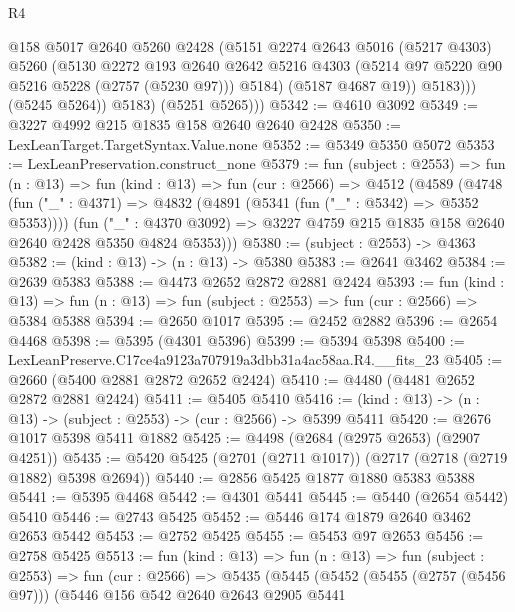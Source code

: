 \begin{lexlean}{R4}
\begin{coremodule}
                  @158
                  @5017
                  @2640
                  @5260
                  @2428
                  (@5151
                    @2274
                    @2643
                    @5016
                    (@5217 @4303)
                    @5260
                    (@5130
                      @2272
                      @193
                      @2640
                      @2642
                      @5216
                      @4303
                      (@5214 @97 @5220 @90 @5216 @5228 (@2757 (@5230 @97)))
                      @5184)
                    (@5187 @4687 @19))
                  @5183)))
            (@5245 @5264))
          @5183)
        (@5251 @5265)))
@5342 := @4610 @3092
@5349 := @3227 @4992 @215 @1835 @158 @2640 @2640 @2428
@5350 := LexLeanTarget.TargetSyntax.Value.none
@5352 := @5349 @5350 @5072
@5353 := LexLeanPreservation.construct_none
@5379 := fun (subject : @2553) =>
  fun (n : @13) =>
  fun (kind : @13) =>
  fun (cur : @2566) =>
  @4512
    (@4589
      (@4748
        (fun ("_" : @4371) => @4832 (@4891 (@5341 (fun ("_" : @5342) => @5352 @5353))))
        (fun ("_" : @4370 @3092) =>
        @3227 @4759 @215 @1835 @158 @2640 @2640 @2428 @5350 @4824 @5353)))
@5380 := (subject : @2553) -> @4363
@5382 := (kind : @13) -> (n : @13) -> @5380
@5383 := @2641 @3462
@5384 := @2639 @5383
@5388 := @4473 @2652 @2872 @2881 @2424
@5393 := fun (kind : @13) =>
  fun (n : @13) => fun (subject : @2553) => fun (cur : @2566) => @5384 @5388
@5394 := @2650 @1017
@5395 := @2452 @2882
@5396 := @2654 @4468
@5398 := @5395 (@4301 @5396)
@5399 := @5394 @5398
@5400 := LexLeanPreserve.C17ce4a9123a707919a3dbb31a4ac58aa.R4.__fits_23
@5405 := @2660 (@5400 @2881 @2872 @2652 @2424)
@5410 := @4480 (@4481 @2652 @2872 @2881 @2424)
@5411 := @5405 @5410
@5416 := (kind : @13) -> (n : @13) -> (subject : @2553) -> (cur : @2566) -> @5399 @5411
@5420 := @2676 @1017 @5398 @5411 @1882
@5425 := @4498 (@2684 (@2975 @2653) (@2907 @4251))
@5435 := @5420 @5425 (@2701 (@2711 @1017)) (@2717 (@2718 (@2719 @1882) @5398 @2694))
@5440 := @2856 @5425 @1877 @1880 @5383 @5388
@5441 := @5395 @4468
@5442 := @4301 @5441
@5445 := @5440 (@2654 @5442) @5410
@5446 := @2743 @5425
@5452 := @5446 @174 @1879 @2640 @3462 @2653 @5442
@5453 := @2752 @5425
@5455 := @5453 @97 @2653
@5456 := @2758 @5425
@5513 := fun (kind : @13) =>
  fun (n : @13) =>
  fun (subject : @2553) =>
  fun (cur : @2566) =>
  @5435
    (@5445
      (@5452
        (@5455 (@2757 (@5456 @97)))
        (@5446
          @156
          @542
          @2640
          @2643
          @2905
          @5441

\end{coremodule}
\end{lexlean}
